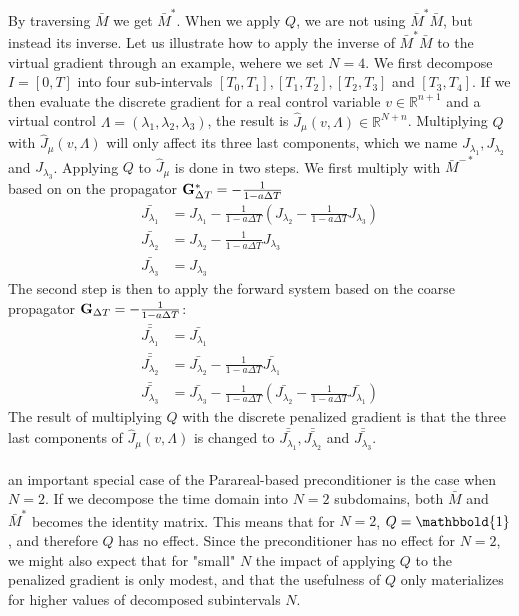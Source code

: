 By traversing $\bar M$ we get $\bar M^*$. When we apply $Q$, we are not using $\bar M^*\bar M$, but instead its inverse. Let us illustrate how to apply the inverse of $\bar M^*\bar M$ to the virtual gradient through an example, wehere we set $N=4$. We first decompose $I=[0,T]$ into four sub-intervals $[T_0,T_1], [T_1,T_2], [T_2,T_3]$ and $[T_3,T_4]$. If we then evaluate the discrete gradient for a real control variable $v\in\mathbb{R}^{n+1}$ and a virtual control $\Lambda =(\lambda_1,\lambda_2,\lambda_3)$, the result is $\hat J_{\mu}(v,\Lambda)\in\mathbb{R}^{N+n}$. Multiplying $Q$ with $\hat J_{\mu}(v,\Lambda)$ will only affect its three last components, which we name $J_{\lambda_1},J_{\lambda_2}$ and $J_{\lambda_3}$. Applying $Q$ to $\hat J_{\mu}$ is done in two steps. We first multiply with $\bar M^{-*}$ based on on the propagator $\bold G_{\Delta T}^*= -\frac{1}{1-a\Delta T} $ 
\begin{align*}
\bar{J_{\lambda_1}} &=J_{\lambda_1} -\frac{1}{1-a\Delta T}(J_{\lambda_2} -\frac{1}{1-a\Delta T}J_{\lambda_3})\\
\bar{J_{\lambda_2}} &=J_{\lambda_2} -\frac{1}{1-a\Delta T}J_{\lambda_3}\\
\bar{J_{\lambda_3}} &=J_{\lambda_3} 
\end{align*} 
The second step is then to apply the forward system based on the coarse propagator $\bold G_{\Delta T}= -\frac{1}{1-a\Delta T} $:
\begin{align*}
\bar{\bar{J_{\lambda_1}}}&=\bar{J_{\lambda_1}} \\
\bar{\bar{J_{\lambda_2}}}&=\bar{J_{\lambda_2}}-\frac{1}{1-a\Delta T}\bar{J_{\lambda_1}} \\
\bar{\bar{J_{\lambda_3}}}&=\bar{J_{\lambda_3}} -\frac{1}{1-a\Delta T}(\bar{J_{\lambda_2}}-\frac{1}{1-a\Delta T}\bar{J_{\lambda_1}})
\end{align*} 
The result of multiplying $Q$ with the discrete penalized gradient is that the three last components of $\hat J_{\mu}(v,\Lambda)$ is changed to $\bar{\bar{J_{\lambda_1}}},\bar{\bar{J_{\lambda_2}}}$ and $\bar{\bar{J_{\lambda_3}}}$. 
\\
\\
an important special case of the Parareal-based preconditioner is the case when $N=2$. If we decompose the time domain into $N=2$ subdomains, both $\bar M$ and $\bar M^*$ becomes the identity matrix. This means that for $N=2$, $Q=\mathbbold{1}$, and therefore $Q$ has no effect. Since the preconditioner has no effect for $N=2$, we might also expect that for "small" $N$ the impact of applying $Q$ to the penalized gradient is only modest, and that the usefulness of $Q$ only materializes for higher values of decomposed subintervals $N$.
